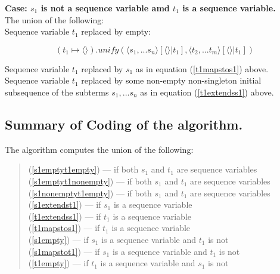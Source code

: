 \documentclass[10pt,a4paper,fleqn]{article}
\begin{document}
\noindent
\textbf{Case: $s_1$ is not a sequence variable amd $t_1$ is a sequence variable.} \\

\noindent 
The union of the following: \\

\noindent
Sequence variable $t_1$ replaced by empty:

\begin{equation}
 \label{t1empty}
 (t_1 \mapsto \langle \rangle)
      .unify(\langle s_1,...s_n \rangle[\langle \rangle|t_1],
             \langle t_2,...t_m \rangle[\langle \rangle|t_1]
						) 
\end{equation}
 
\noindent
Sequence variable $t_1$ replaced by $s_1$ as in equation (\ref{t1mapstos1}) above. \\

\noindent
Sequence variable $t_1$ replaced by some
non-empty non-singleton initial subsequence of the subterms $s_1,...s_n$ 
as in equation (\ref{t1extendss1}) above. \\

\subsection{Summary of Coding of the algorithm.}
The algorithm computes the union of the following: 
\begin{quote}
(\ref{s1emptyt1empty}) --- if both $s_1$ and $t_1$ are sequence variables \\
(\ref{s1emptyt1nonempty}) --- if both $s_1$ and $t_1$ are sequence variables \\
(\ref{s1nonemptyt1empty}) --- if both $s_1$ and $t_1$ are sequence variables \\
(\ref{s1extendst1}) --- if $s_1$ is a sequence variable  \\
(\ref{t1extendss1}) --- if $t_1$ is a sequence variable \\
(\ref{t1mapstos1}) --- if $t_1$ is a sequence variable \\
(\ref{s1empty}) --- if $s_1$ is a sequence variable and $t_1$ is not\\
(\ref{s1mapstot1}) --- if $s_1$ is a sequence variable and $t_1$ is not\\
(\ref{t1empty}) --- if $t_1$ is a sequence variable and $s_1$ is not \\
\end{quote}


 
\end{document}
